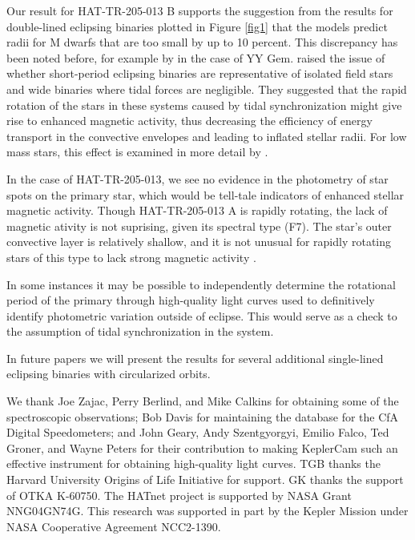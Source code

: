 \documentclass[12pt, preprint]{aastex}
\begin{document}
Our result for HAT-TR-205-013 B supports the suggestion from the results for double-lined eclipsing binaries plotted in Figure \ref{fig1} that the models predict radii for M dwarfs that are too small by up to 10 percent. This discrepancy has been noted before, for example by \citet{torres2002} in the case of YY Gem. \citet{torres2006} raised the issue of whether short-period eclipsing binaries are representative of isolated field stars and wide binaries where tidal forces are negligible. They suggested that the rapid rotation of the stars in these systems caused by tidal synchronization might give rise to enhanced magnetic activity, thus decreasing the efficiency of energy transport in the convective envelopes and leading to inflated stellar radii. For low mass stars, this effect is examined in more detail by \cite{lopez2007}.

In the case of HAT-TR-205-013, we see no evidence in the photometry of star spots on the primary star, which would be tell-tale indicators of enhanced stellar magnetic activity. Though HAT-TR-205-013 A is rapidly rotating, the lack of magnetic ativity is not suprising, given its spectral type (F7). The star's outer convective layer is relatively shallow, and it is not unusual for rapidly rotating stars of this type to lack strong magnetic activity \citep{torres2006}.

In some instances it may be possible to independently determine the rotational period of the primary through high-quality light curves used to definitively identify photometric variation outside of eclipse. This would serve as a check to the assumption of tidal synchronization in the system. 

In future papers we will present the results for several additional single-lined eclipsing binaries with circularized orbits.

\acknowledgments
We thank Joe Zajac, Perry Berlind, and Mike Calkins
for obtaining some of the spectroscopic observations; Bob Davis for
maintaining the database for the CfA Digital Speedometers; and John
Geary, Andy Szentgyorgyi, Emilio Falco, Ted Groner, and Wayne Peters
for their contribution to making KeplerCam such an effective
instrument for obtaining high-quality light curves. TGB thanks the
Harvard University Origins of Life Initiative for support. GK thanks the support of OTKA K-60750. 
The HATnet project is supported by NASA Grant NNG04GN74G. This research was supported in part by the Kepler Mission under NASA Cooperative Agreement NCC2-1390.
\end{document}
